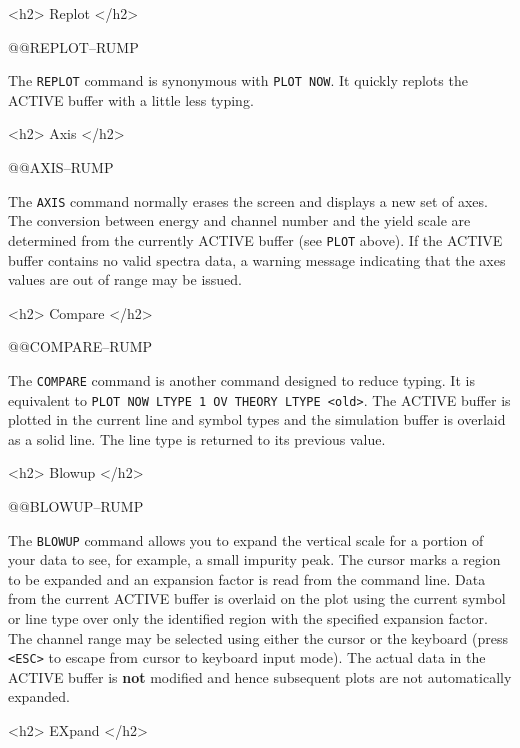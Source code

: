 {<h2> Replot </h2>


@@{REPLOT--RUMP}

The {\tt REPLOT} command is synonymous with {\tt PLOT NOW}.  It quickly
replots the ACTIVE buffer with a little less typing.

<h2> Axis </h2>


@@{AXIS--RUMP}

The {\tt AXIS} command normally erases the screen and displays a new
set of axes.  The conversion between energy and channel number and the yield
scale are determined from the currently ACTIVE buffer (see {\tt PLOT} above).
If the ACTIVE buffer contains no valid spectra data, a warning message
indicating that the axes values are out of range may be issued.

<h2> Compare </h2>


@@{COMPARE--RUMP}

The {\tt COMPARE} command is another command designed to reduce typing.  It is
equivalent to {\tt PLOT NOW LTYPE 1 OV THEORY LTYPE <old>}.  The ACTIVE buffer
is plotted in the current line and symbol types and the simulation buffer is
overlaid as a solid line.  The line type is returned to its previous value.


<h2> Blowup </h2>


@@{BLOWUP--RUMP}

The {\tt BLOWUP} command allows you to expand the vertical scale for a portion
of your data to see, for example, a small impurity peak.  The cursor marks a
region to be expanded and an expansion factor is read from the command line.
Data from the current ACTIVE buffer is overlaid on the plot using the current
symbol or line type over only the identified region with the specified
expansion factor.  The channel range may be selected using either the cursor
or the keyboard (press {\tt <ESC>} to escape from cursor to keyboard input
mode).  The actual data in the ACTIVE buffer is {\bf not} modified and hence
subsequent plots are not automatically expanded.

<h2> EXpand </h2>


}
